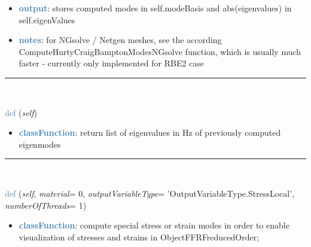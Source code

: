 \begin{itemize}[leftmargin=1.4cm]
\begin{itemize}[leftmargin=1.4cm]
\begin{itemize}[leftmargin=1.4cm]
\begin{itemize}[leftmargin=0.5cm]
\begin{itemize}[leftmargin=1.4cm]
\begin{itemize}[leftmargin=1.4cm]
\begin{itemize}[leftmargin=1.4cm]
\begin{itemize}[leftmargin=0.5cm]
\begin{itemize}[leftmargin=0.7cm]
\begin{itemize}[leftmargin=1.2cm]
\item[]{\it numberOfRigidBodyModes}: only used in case that no boundary interfaces (node lists) exist, then the rigid body motion can be excluded using this number of rigid body modes (in 3D usually)
\item[]{\it verboseMode}: if True, some additional output is printed
\item[]{\it timerTreshold}: for more DOF than this number, CPU times are printed even with verboseMode=False
\end{itemize}
\item[--]\textcolor{steelblue}{\bf output}: stores computed modes in self.modeBasis and abs(eigenvalues) in self.eigenValues
\item[--]\textcolor{steelblue}{\bf notes}: for NGsolve / Netgen meshes, see the according ComputeHurtyCraigBamptonModesNGsolve function, which is usually much faster - currently only implemented for RBE2 case
\vspace{12pt}\end{itemize}
%
\noindent\rule{8cm}{0.75pt}\vspace{1pt} \\ 
\begin{flushleft}
\noindent \textcolor{steelblue}{def {\bf {}}}\label{sec:FEM:FEMinterface:GetEigenFrequenciesHz}
({\it self})
\end{flushleft}
\setlength{\itemindent}{0.7cm}
\begin{itemize}[leftmargin=0.7cm]
\item[--]\textcolor{steelblue}{\bf classFunction}: return list of eigenvalues in Hz of previously computed eigenmodes
\vspace{12pt}\end{itemize}
%
\noindent\rule{8cm}{0.75pt}\vspace{1pt} \\ 
\begin{flushleft}
\noindent \textcolor{steelblue}{def {\bf {}}}\label{sec:FEM:FEMinterface:ComputePostProcessingModes}
({\it self}, {\it material}= 0, {\it outputVariableType}= 'OutputVariableType.StressLocal', {\it numberOfThreads}= 1)
\end{flushleft}
\setlength{\itemindent}{0.7cm}
\begin{itemize}[leftmargin=0.7cm]
\item[--]\textcolor{steelblue}{\bf classFunction}: compute special stress or strain modes in order to enable visualization of stresses and strains in ObjectFFRFreducedOrder;

\end{itemize}
\end{itemize}
\end{itemize}
\end{itemize}
\end{itemize}
\end{itemize}
\end{itemize}
\end{itemize}
\end{itemize}
